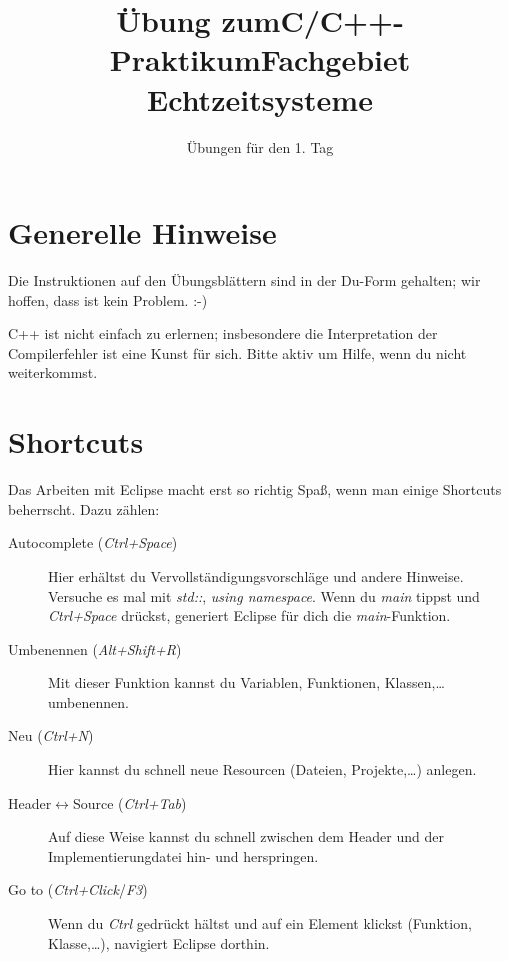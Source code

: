 

\newcommand{\tag}{1}

\title{Übung zum\linebreak[1]C/C++-Praktikum\linebreak[1] Fachgebiet Echtzeitsysteme}
\subtitle{Übungen für den \tag{}. Tag}



\begin{examheader}
	\textmb{Übung zum C/C++-Praktikum - Tag \tag{}}
\end{examheader}
\maketitle 

\vspace{5mm}

\section*{Generelle Hinweise}

Die Instruktionen auf den Übungsblättern sind in der Du-Form gehalten; wir hoffen, dass ist kein Problem. :-)

C++ ist nicht einfach zu erlernen; insbesondere die Interpretation der Compilerfehler ist eine Kunst für sich.
Bitte aktiv um Hilfe, wenn du nicht weiterkommst.

\section*{Shortcuts}

Das Arbeiten mit Eclipse macht erst so richtig Spaß, wenn man einige Shortcuts beherrscht.
Dazu zählen:
\begin{description}
	\item[Autocomplete (\emph{Ctrl+Space})]
	Hier erhältst du Vervollständigungsvorschläge und andere Hinweise.
	Versuche es mal mit \emph{std::}, \emph{using namespace}.
	Wenn du \emph{main} tippst und \emph{Ctrl+Space} drückst, generiert Eclipse für dich die \emph{main}-Funktion.
	
	\item[Umbenennen (\emph{Alt+Shift+R})]
	Mit dieser Funktion kannst du Variablen, Funktionen, Klassen,\dots umbenennen.
	
	\item[Neu (\emph{Ctrl+N})]
	Hier kannst du schnell neue Resourcen (Dateien, Projekte,\dots) anlegen.
	
	\item[Header$\leftrightarrow$Source (\emph{Ctrl+Tab})]
	Auf diese Weise kannst du schnell zwischen dem Header und der Implementierungdatei hin- und herspringen.
	
	\item[Go to (\emph{Ctrl+Click}/\emph{F3})] Wenn du \emph{Ctrl} gedrückt hältst und auf ein Element klickst (Funktion, Klasse,\dots), navigiert Eclipse dorthin.
\end{description}

